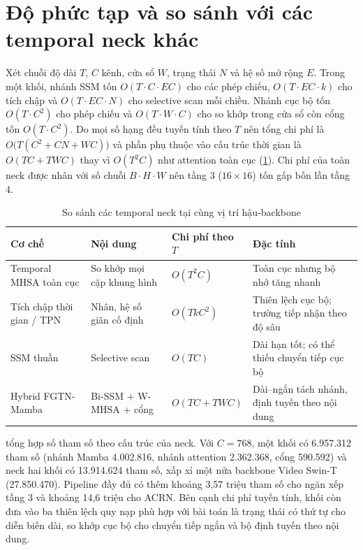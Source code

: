 \section{Độ phức tạp và so sánh với các temporal neck khác}
\label{sec:complexity}

Xét chuỗi độ dài $T$, $C$ kênh, cửa sổ $W$, trạng thái $N$ và hệ số mở rộng $E$. Trong một khối, nhánh SSM tốn $O(T \cdot C \cdot EC)$ cho các phép chiếu, $O(T \cdot EC \cdot k)$ cho tích chập và $O(T \cdot EC \cdot N)$ cho selective scan mỗi chiều. Nhánh cục bộ tốn $O(T \cdot C^2)$ cho phép chiếu và $O(T \cdot W \cdot C)$ cho so khớp trong cửa sổ còn cổng tốn $O(T \cdot C^2)$. Do mọi số hạng đều tuyến tính theo $T$ nên tổng chi phí là $O\big(T(C^2 + CN + WC)\big)$ và phần phụ thuộc vào cấu trúc thời gian là $O(TC + TWC)$ thay vì $O(T^2 C)$ như attention toàn cục (\cref{tab:necks}). Chi phí của toàn neck được nhân với số chuỗi $B \cdot H \cdot W$ nên tầng 3 ($16 \times 16$) tốn gấp bốn lần tầng 4.

\begin{table}[H]
\centering
\caption{So sánh các temporal neck tại cùng vị trí hậu-backbone}
\label{tab:necks}
\small
\begin{tabularx}{\textwidth}{lXlX}
\toprule
\textbf{Cơ chế} & \textbf{Nội dung} & \textbf{Chi phí theo $T$} & \textbf{Đặc tính}\\
\midrule
Temporal MHSA toàn cục & So khớp mọi cặp khung hình & $O(T^2 C)$ & Toàn cục nhưng bộ nhớ tăng nhanh\\
Tích chập thời gian / TPN \cite{yang2020tpn} & Nhân, hệ số giãn cố định & $O(T k C^2)$ & Thiên lệch cục bộ; trường tiếp nhận theo độ sâu\\
SSM thuần \cite{li2024videomamba} & Selective scan & $O(TC)$ & Dài hạn tốt; có thể thiếu chuyển tiếp cục bộ\\
Hybrid FGTN-Mamba & Bi-SSM + W-MHSA + cổng & $O(TC + TWC)$ & Dài--ngắn tách nhánh, định tuyến theo nội dung\\
\bottomrule
\end{tabularx}
\end{table}

 tổng hợp số tham số theo cấu trúc của neck. Với $C = 768$, một khối có 6.957.312 tham số (nhánh Mamba 4.002.816, nhánh attention 2.362.368, cổng 590.592) và neck hai khối có 13.914.624 tham số, xấp xỉ một nửa backbone Video Swin-T (27.850.470). Pipeline đầy đủ có thêm khoảng 3,57 triệu tham số cho ngăn xếp tầng 3 và khoảng 14,6 triệu cho ACRN. Bên cạnh chi phí tuyến tính, khối còn đưa vào ba thiên lệch quy nạp phù hợp với bài toán là trạng thái có thứ tự cho diễn biến dài, so khớp cục bộ cho chuyển tiếp ngắn và bộ định tuyến theo nội dung.

